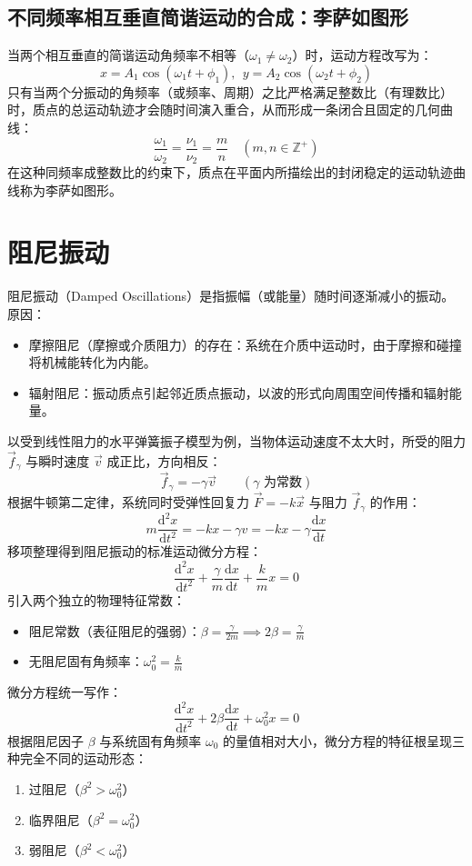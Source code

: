 \documentclass[lang=cn,11pt]{elegantbook}
\begin{document}
\subsection{不同频率相互垂直简谐运动的合成：李萨如图形}

当两个相互垂直的简谐运动角频率不相等（$\omega_1 \neq \omega_2$）时，运动方程改写为：$$x = A_1 \cos(\omega_1 t + \phi_1),~~y = A_2 \cos(\omega_2 t + \phi_2)$$
只有当两个分振动的角频率（或频率、周期）之比严格满足整数比（有理数比）时，质点的总运动轨迹才会随时间演入重合，从而形成一条闭合且固定的几何曲线：$$\frac{\omega_1}{\omega_2} = \frac{\nu_1}{\nu_2} = \frac{m}{n} \quad (m, n \in \mathbb{Z}^+)$$在这种同频率成整数比的约束下，质点在平面内所描绘出的封闭稳定的运动轨迹曲线称为李萨如图形。

\section{阻尼振动}
\begin{definition}[阻尼振动]
    阻尼振动（Damped Oscillations）是指振幅（或能量）随时间逐渐减小的振动。原因：
    \begin{itemize}
    \item 摩擦阻尼（摩擦或介质阻力）的存在：系统在介质中运动时，由于摩擦和碰撞将机械能转化为内能。
    \item 辐射阻尼：振动质点引起邻近质点振动，以波的形式向周围空间传播和辐射能量。
    \end{itemize}
    以受到线性阻力的水平弹簧振子模型为例，当物体运动速度不太大时，所受的阻力 $\vec{f}_\gamma$ 与瞬时速度 $\vec{v}$ 成正比，方向相反：
    $$\vec{f}_\gamma = -\gamma \vec{v} \qquad (\gamma \text{ 为常数})$$
    根据牛顿第二定律，系统同时受弹性回复力 $\vec{F} = -k\vec{x}$ 与阻力 $\vec{f}_\gamma$ 的作用：$$m \frac{\mathrm{d}^2x}{\mathrm{d}t^2} = -kx - \gamma v = -kx - \gamma \frac{\mathrm{d}x}{\mathrm{d}t}$$移项整理得到阻尼振动的标准运动微分方程：$$\frac{\mathrm{d}^2x}{\mathrm{d}t^2} + \frac{\gamma}{m} \frac{\mathrm{d}x}{\mathrm{d}t} + \frac{k}{m} x = 0$$引入两个独立的物理特征常数：
    \begin{itemize}
    \item 阻尼常数（表征阻尼的强弱）：$\beta = \frac{\gamma}{2m} \implies 2\beta = \frac{\gamma}{m}$
    \item 无阻尼固有角频率：$\omega_0^2 = \frac{k}{m}$
    \end{itemize}
    微分方程统一写作：\[\boxed{\frac{\mathrm{d}^2x}{\mathrm{d}t^2} + 2\beta \frac{\mathrm{d}x}{\mathrm{d}t} + \omega_0^2 x = 0}\]根据阻尼因子 $\beta$ 与系统固有角频率 $\omega_0$ 的量值相对大小，微分方程的特征根呈现三种完全不同的运动形态：
    \begin{enumerate}
    \item 过阻尼（$\beta^2 > \omega_0^2$）
    \item 临界阻尼（$\beta^2 = \omega_0^2$）
    \item 弱阻尼（$\beta^2 < \omega_0^2$）
    \end{enumerate}
\end{definition}
\end{document}
